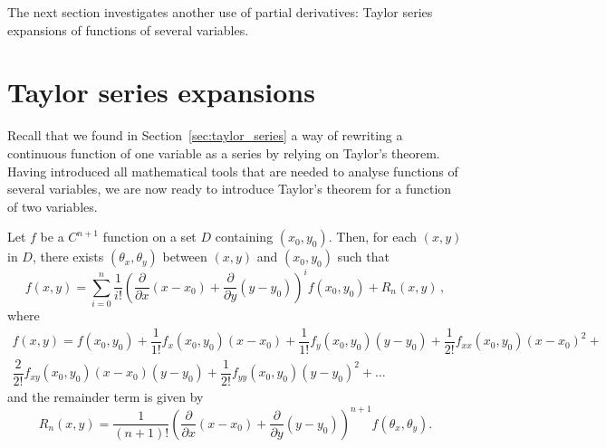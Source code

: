 The next section investigates another use of partial derivatives: Taylor series expansions of functions of several variables.

\section{Taylor series expansions}\label{sec:taylor_multi_var}
Recall that we found in Section~\ref{sec:taylor_series} a way of rewriting a continuous function of one variable as a series by relying on Taylor's theorem. Having introduced all mathematical tools that are needed to analyse functions of several variables, we are now ready to introduce Taylor's theorem for a function of two variables.

\begin{theorem}\label{thm:taylor2thm}
Let $f$ be a $C^{n+1}$ function on a set $D$ containing $(x_0,y_0)$. Then, for each $(x,y)$ in $D$, there exists $(\theta_x,\theta_y)$ between $(x,y)$ and $(x_0,y_0)$ such that
\begin{equation*}
f(x,y) =\sum_{i=0}^n\dfrac{1}{i!}\left(\dfrac{\partial}{\partial x}(x-x_0)+\dfrac{\partial}{\partial y}(y-y_0)\right)^i f(x_0,y_0)+R_n(x,y)\,,
\end{equation*}
where
\begin{multline*}
f(x,y)=f(x_0,y_0)+\dfrac{1}{1!}f_x(x_0,y_0)(x-x_0)+\dfrac{1}{1!}f_y(x_0,y_0)(y-y_0)+\dfrac{1}{2!}f_{xx}(x_0,y_0)(x-x_0)^2+\\[0.2cm]
\dfrac{2}{2!} f_{xy}(x_0,y_0)(x-x_0)(y-y_0)+\dfrac{1}{2!}f_{yy}(x_0,y_0)(y-y_0)^2+\ldots
\end{multline*}
and the remainder term is given by
$$
R_n(x,y)=\dfrac{1}{(n+1)!}\left(\dfrac{\partial}{\partial x}(x-x_0)+\dfrac{\partial}{\partial y}(y-y_0)\right)^{n+1}f(\theta_x,\theta_y).
$$

\end{theorem}


